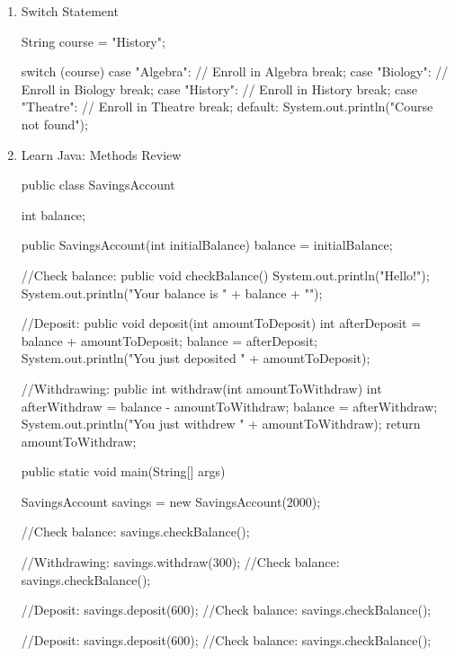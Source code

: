 \documentclass[a4paper,12pt]{article}
\begin{document}
\fontsize{14pt}{15.6pt}
\selectfont

\begin{enumerate}

\item Switch Statement
\begin{javacode}
String course = "History";

switch (course) {
  case "Algebra": 
    // Enroll in Algebra
    break; 
  case "Biology": 
    // Enroll in Biology
    break;
  case "History": 
    // Enroll in History
    break;
  case "Theatre":
    // Enroll in Theatre
    break;
  default:
    System.out.println("Course not found");
}
\end{javacode}

\item Learn Java: Methods Review
\begin{javacode}
public class SavingsAccount {

  int balance;

  public SavingsAccount(int initialBalance) {
    balance = initialBalance;
  }

  //Check balance:
  public void checkBalance() {
    System.out.println("Hello!");
    System.out.println("Your balance is " + balance + "\n");
  }

  //Deposit:
  public void deposit(int amountToDeposit) {
    int afterDeposit = balance + amountToDeposit;
    balance = afterDeposit;
    System.out.println("You just deposited " + amountToDeposit);
  }

  //Withdrawing:
  public int withdraw(int amountToWithdraw) {
    int afterWithdraw = balance - amountToWithdraw;
    balance = afterWithdraw;
    System.out.println("You just withdrew " + amountToWithdraw);
    return amountToWithdraw;
  }

  public static void main(String[] args) {
    SavingsAccount savings = new SavingsAccount(2000);

    //Check balance:
    savings.checkBalance();

    //Withdrawing:
    savings.withdraw(300);
    //Check balance:
    savings.checkBalance();

    //Deposit:
    savings.deposit(600);
    //Check balance:
    savings.checkBalance();

    //Deposit:
    savings.deposit(600);
    //Check balance:
    savings.checkBalance();
  }
}
\end{javacode}


\end{enumerate}
\end{document}
